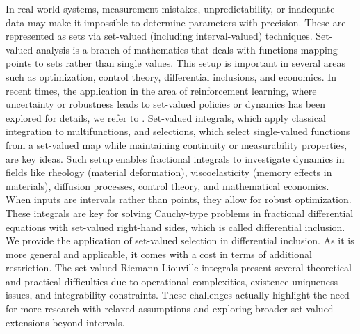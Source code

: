 \documentclass[a4paper,12pt,reqno]{amsart}
\numberwithin{equation}{section}
\theoremstyle{definition}
\theoremstyle{remark}
\numberwithin{equation}{section}
\begin{document}
In real-world systems, measurement mistakes, unpredictability, or inadequate data may make it impossible to determine parameters with precision. These are represented as sets via set-valued (including interval-valued) techniques. Set-valued analysis is a branch of mathematics that deals with functions mapping points to sets rather than single values. This setup is important in several areas such as optimization, control theory, differential inclusions, and economics. In recent times, the application in the area of reinforcement learning, where uncertainty or robustness leads to set-valued policies or dynamics has been explored for details, we refer to \cite{ergen}. Set-valued integrals, which apply classical integration to multifunctions, and selections, which select single-valued functions from a set-valued map while maintaining continuity or measurability properties, are key ideas. Such setup enables fractional integrals to investigate dynamics in fields like rheology (material deformation), viscoelasticity (memory effects in materials), diffusion processes, control theory, and mathematical economics. When inputs are intervals rather than points, they allow for robust optimization. These integrals are key for solving Cauchy-type problems in fractional differential equations with set-valued right-hand sides, which is called differential inclusion. We provide the application of set-valued selection in differential inclusion. As it is more general and applicable, it comes with a cost in terms of additional restriction. The set-valued Riemann-Liouville integrals present several theoretical and practical difficulties due to operational complexities, existence-uniqueness issues, and integrability constraints. These challenges actually highlight the need for more research with relaxed assumptions and exploring broader set-valued extensions beyond intervals.
    
\par
\end{document}
